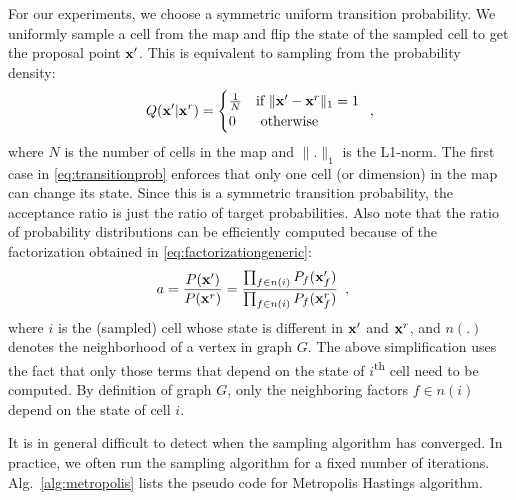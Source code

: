 \documentclass[letterpaper, 10 pt, conference]{ieeeconf} %
\begin{document}
For our experiments, we choose a symmetric uniform transition 
probability.  We uniformly sample a cell from the map and flip the state of the
sampled cell to get the proposal point $\mathbf{x}'$. This is equivalent to sampling
from the probability density:
\begin{align}
  Q(\mathbf{x}'| \mathbf{x}^r) = \begin{cases}
    \frac{1}{N} & \text{if $\|\mathbf{x}' - \mathbf{x}^r\|_1 = 1$}\\
      0 & \text{ otherwise}
  \end{cases}\enspace,
  \label{eq:transitionprob}
\end{align}
where $N$ is the number of cells in the map and $\|.\|_1$ is the L1-norm. The
first case in \eqref{eq:transitionprob} enforces that only one cell (or dimension)
in the map can change its state. Since this is a symmetric transition
probability, the acceptance ratio is just the ratio of target probabilities.
Also note that the ratio of probability distributions can be efficiently
computed because of the factorization obtained in
\eqref{eq:factorizationgeneric}:
\begin{align}
  a &= \frac{P(\mathbf{x}')}{P(\mathbf{x}^r)}
    = \frac{\prod_{f \in n(i)} P_f(\mathbf{x}'_f)}{\prod_{f \in n(i)} P_f(\mathbf{x}^r_f)}
    \enspace,
  \label{eq:acceptanceprob}
\end{align}
where $i$ is the (sampled) cell whose state is different in $\mathbf{x}'$ and $\mathbf{x}^r$,
and $n(.)$ denotes the neighborhood of a vertex in graph $G$.  
The above simplification uses the fact that only those terms  that depend on
the state of $i$\textsuperscript{th} cell need to be computed. By definition
of graph $G$, only the neighboring factors $f \in n(i)$ depend on the state of cell $i$.

It is in general difficult to detect when the sampling algorithm has converged.
In practice, we often run the sampling algorithm for a fixed number of
iterations. Alg.~\ref{alg:metropolis} lists the pseudo code for Metropolis
Hastings algorithm.

\end{document}
